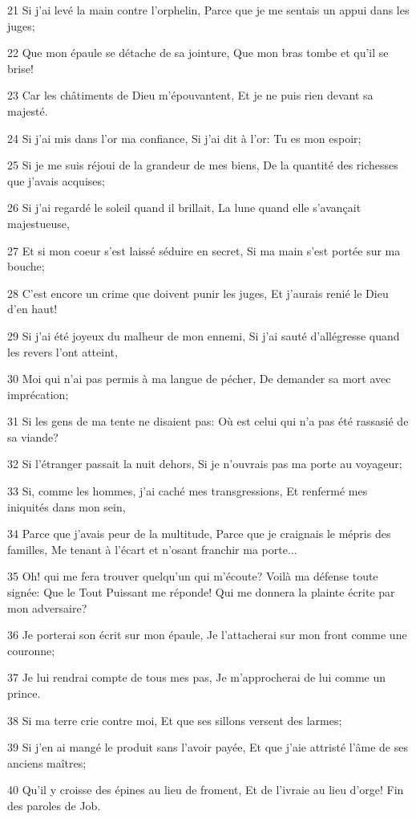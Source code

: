 \par 21 Si j'ai levé la main contre l'orphelin, Parce que je me sentais un appui dans les juges;
\par 22 Que mon épaule se détache de sa jointure, Que mon bras tombe et qu'il se brise!
\par 23 Car les châtiments de Dieu m'épouvantent, Et je ne puis rien devant sa majesté.
\par 24 Si j'ai mis dans l'or ma confiance, Si j'ai dit à l'or: Tu es mon espoir;
\par 25 Si je me suis réjoui de la grandeur de mes biens, De la quantité des richesses que j'avais acquises;
\par 26 Si j'ai regardé le soleil quand il brillait, La lune quand elle s'avançait majestueuse,
\par 27 Et si mon coeur s'est laissé séduire en secret, Si ma main s'est portée sur ma bouche;
\par 28 C'est encore un crime que doivent punir les juges, Et j'aurais renié le Dieu d'en haut!
\par 29 Si j'ai été joyeux du malheur de mon ennemi, Si j'ai sauté d'allégresse quand les revers l'ont atteint,
\par 30 Moi qui n'ai pas permis à ma langue de pécher, De demander sa mort avec imprécation;
\par 31 Si les gens de ma tente ne disaient pas: Où est celui qui n'a pas été rassasié de sa viande?
\par 32 Si l'étranger passait la nuit dehors, Si je n'ouvrais pas ma porte au voyageur;
\par 33 Si, comme les hommes, j'ai caché mes transgressions, Et renfermé mes iniquités dans mon sein,
\par 34 Parce que j'avais peur de la multitude, Parce que je craignais le mépris des familles, Me tenant à l'écart et n'osant franchir ma porte...
\par 35 Oh! qui me fera trouver quelqu'un qui m'écoute? Voilà ma défense toute signée: Que le Tout Puissant me réponde! Qui me donnera la plainte écrite par mon adversaire?
\par 36 Je porterai son écrit sur mon épaule, Je l'attacherai sur mon front comme une couronne;
\par 37 Je lui rendrai compte de tous mes pas, Je m'approcherai de lui comme un prince.
\par 38 Si ma terre crie contre moi, Et que ses sillons versent des larmes;
\par 39 Si j'en ai mangé le produit sans l'avoir payée, Et que j'aie attristé l'âme de ses anciens maîtres;
\par 40 Qu'il y croisse des épines au lieu de froment, Et de l'ivraie au lieu d'orge! Fin des paroles de Job.

